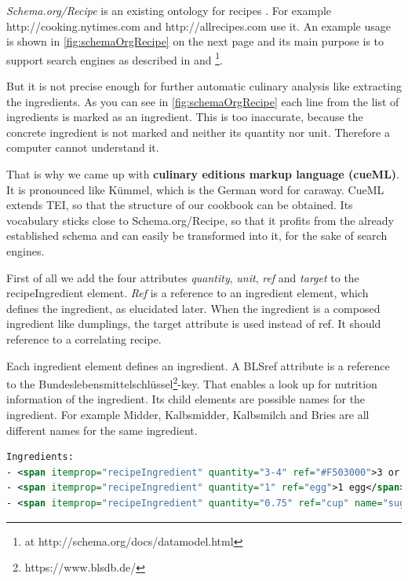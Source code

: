 \documentclass[12pt, twoside]{report}
\begin{document}
\textit{Schema.org/Recipe} is an existing ontology for recipes \parencite{schemaOrg}. For example http://cooking.nytimes.com and http://allrecipes.com use it. An example usage is shown in \cref{fig:schemaOrgRecipe} on the next page and its main purpose is to support search engines as described in \parencite{foodBlogger} and \parencite{schemaOrg} \footnote{at http://schema.org/docs/datamodel.html}.

But it is not precise enough for further automatic culinary analysis like extracting the ingredients. As you can see in \cref{fig:schemaOrgRecipe} each line from the list of ingredients is marked as an ingredient. This is too inaccurate, because the concrete ingredient is not marked and neither its quantity nor unit. Therefore a computer cannot understand it.

\newpage
That is why we came up with \textbf{culinary editions markup language (cueML)}. It is pronounced like Kümmel, which is the German word for caraway. CueML extends TEI, so that the structure of our cookbook can be obtained. Its vocabulary sticks close to Schema.org/Recipe, so that it profits from the already established schema and can easily be transformed into it, for the sake of search engines. 

First of all we add the four attributes \textit{quantity}, \textit{unit}, \textit{ref} and \textit{target} to the recipeIngredient element. \textit{Ref} is a reference to an ingredient element, which defines the ingredient, as elucidated later. When the ingredient is a composed ingredient like dumplings, the target attribute is used instead of ref. It should reference to a correlating recipe.

Each ingredient element defines an ingredient. A BLSref attribute is a reference to the Bundeslebensmittelschlüssel\footnote{https://www.blsdb.de/}-key. That enables a look up for nutrition information of the ingredient. Its child elements are possible names for the ingredient. For example Midder, Kalbsmidder, Kalbsmilch and Bries are all different names for the same ingredient.

\begin{minipage}{\linewidth} %
\begin{lstlisting}[language=XML, caption={Example for cueML}, label=lst:exampleCueML]
Ingredients:
- <span itemprop="recipeIngredient" quantity="3-4" ref="#F503000">3 or 4 ripe bananas, smashed</span>
- <span itemprop="recipeIngredient" quantity="1" ref="egg">1 egg</span>
- <span itemprop="recipeIngredient" quantity="0.75" ref="cup" name="sugar">3/4 cup of sugar</span>
\end{lstlisting}
\end{minipage}
\end{document}
